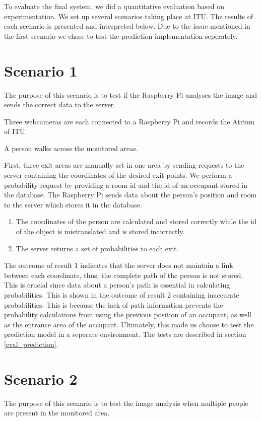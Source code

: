 To evaluate the final system, we did a quantitative evaluation based on experimentation. We set up several scenarios taking place at ITU. The results of each scenario is presented and interpreted below. Due to the issue mentioned in the first scenario we chose to test the prediction implementation seperately.

\section{Scenario 1}
The purpose of this scenario is to test if the Raspberry Pi analyses the image and sends the correct data to the server. 

Three webcameras are each connected to a Raspberry Pi and records the Atrium of ITU. 

A person walks across the monitored areas. 

First, three exit areas are manually set in one area by sending requests to the server containing the coordinates of the desired exit points. We perform a probability request by providing a room id and the id of an occupant stored in the database. The Raspberry Pi sends data about the person's position and room to the server which stores it in the database. 

\begin{enumerate}
\item The coordinates of the person are calculated and stored correctly while the id of the object is mistranslated and is stored incorrectly. 
\item The server returns a set of probabilities to each exit. 
\end{enumerate}

The outcome of result 1 indicates that the server does not maintain a link between each coordinate, thus, the complete path of the person is not stored. This is crucial since data about a person's path is essential in calculating probabilities. This is shown in the outcome of result 2 containing inaccurate probabilities. This is because the lack of path information prevents the probability calculations from using the previous position of an occupant, as well as the entrance area of the occupant. Ultimately, this made us choose to test the prediction model in a seperate environment. The tests are described in section \ref{eval_prediction}.

\section{Scenario 2}
The purpose of this scenario is to test the image analysis when multiple people are present in the monitored area.


